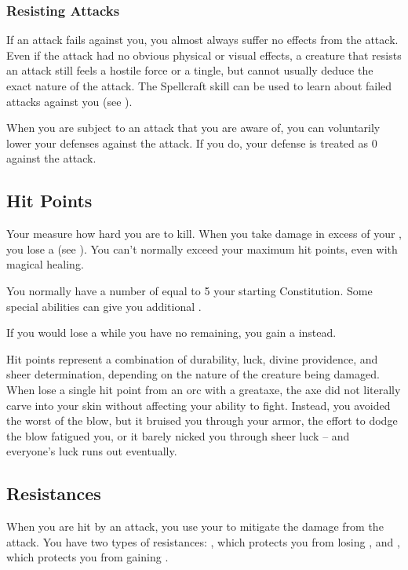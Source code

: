         \subsubsection{Resisting Attacks}
            If an attack fails against you, you almost always suffer no effects from the attack.
            Even if the attack had no obvious physical or visual effects, a creature that resists an attack still feels a hostile force or a tingle, but cannot usually deduce the exact nature of the attack.
            The Spellcraft skill can be used to learn about failed  attacks against you (see ).

             When you are subject to an attack that you are aware of, you can voluntarily lower your defenses against the attack.
            If you do, your defense is treated as 0 against the attack.

    \subsection{Hit Points}\label{Hit Points}
        Your  measure how hard you are to kill.
        When you take damage in excess of your , you lose a  (see ).
        You can't normally exceed your maximum hit points, even with magical healing.

        You normally have a number of  equal to 5 \add your starting Constitution.
        Some special abilities can give you additional .

        If you would lose a  while you have no  remaining, you gain a  instead.

         Hit points represent a combination of durability, luck, divine providence, and sheer determination, depending on the nature of the creature being damaged.
        When lose a single hit point from an orc with a greataxe, the axe did not literally carve into your skin without affecting your ability to fight.
        Instead, you avoided the worst of the blow, but it bruised you through your armor, the effort to dodge the blow fatigued you, or it barely nicked you through sheer luck -- and everyone's luck runs out eventually.

    \subsection{Resistances}\label{Resistances}
        When you are hit by an attack, you use your  to mitigate the damage from the attack.
        You have two types of resistances: , which protects you from losing , and , which protects you from gaining .


